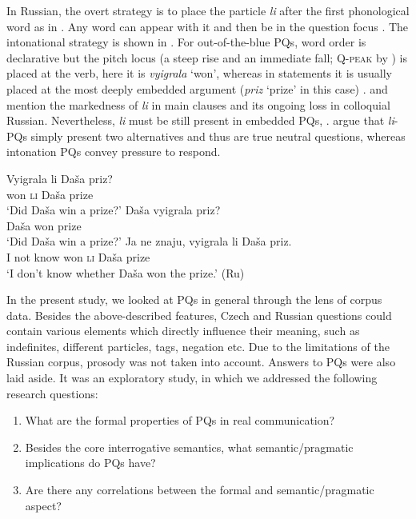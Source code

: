 \documentclass[output=paper,colorlinks,citecolor=brown]{langscibook}
\begin{document}
\noindent In Russian, the overt strategy is to place the particle \textit{li} after the first phonological word as in . Any word can appear with it and then be in the question focus \citep{King1994}. The intonational strategy is shown in . For out-of-the-blue PQs, word order is declarative but the pitch locus (a steep rise and an immediate fall; \textsc{Q-peak} by \citealt{Esipova2024}) is placed at the verb, here it is \textit{vyigrala} `won', whereas in statements it is usually placed at the most deeply embedded argument (\textit{priz} `prize' in this case) \citep{Meyer2006, Rathcke2006}. \citet{Schwabe2004} and \citet{Brown1995} mention the markedness of \textit{li} in main clauses and its ongoing loss in colloquial Russian. Nevertheless, \textit{li} must be still present in embedded PQs, . \citet{Esipova2024a} argue that \textit{li}-PQs simply present two alternatives and thus are true neutral questions, whereas intonation PQs convey pressure to respond.  

\ea \ea \gll Vyigrala li Daša priz? \\ 
won \textsc{li} Daša prize \\
\glt `Did Daša win a prize?' 
\label{ex-ru1a}
\ex \gll Daša vyigrala priz? \\ 
Daša  won  prize \\
\glt `Did Daša win a prize?' 
\label{ex-ru1c}
\ex \gll  Ja ne znaju, vyigrala li Daša priz. \\ 
I not know won \textsc{li} Daša prize \\
\glt `I don't know whether Daša won the prize.' 
\label{ex-ru1b}\hfill (Ru)
\z\z

\noindent In the present study, we looked at PQs in general through the lens of corpus data. Besides the above-described features, Czech and Russian questions could contain various elements which directly influence their meaning, such as indefinites, different particles, tags, negation etc. Due to the limitations of the Russian corpus, prosody was not taken into account. Answers to PQs were also laid aside. It was an exploratory study, in which we addressed the following research questions: 

\begin{enumerate}
    \item What are the formal properties of PQs in real communication? 
    \item Besides the core interrogative semantics, what semantic/pragmatic implications do PQs have? 
    \item Are there any correlations between the formal and semantic/pragmatic aspect?
\end{enumerate}
\end{document}
